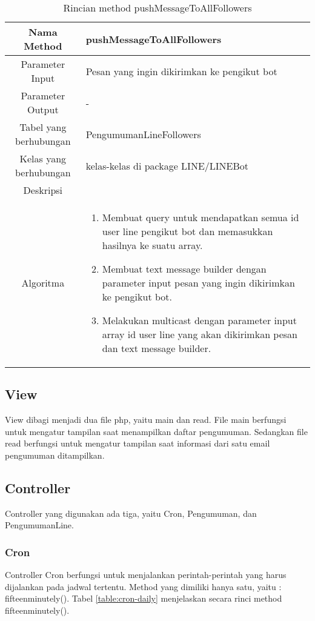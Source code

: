 \begin{center}
	\begin{table}[H]
	\caption{Rincian method pushMessageToAllFollowers}
	\label{table:pengumuman-line-model-pushmessagetoallfollowers}
\begin{tabular}{|c|p{11cm}|}
\hline
Nama Method 	& 	 pushMessageToAllFollowers	\\
\hline
Parameter Input & Pesan yang ingin dikirimkan ke pengikut bot \\
\hline
Parameter Output & - \\
\hline
Tabel yang berhubungan & PengumumanLineFollowers \\
\hline
Kelas yang berhubungan & kelas-kelas di package LINE/LINEBot \\
\hline
Deskripsi	& \\
\hline
Algoritma	& \begin{enumerate}
				\item Membuat query untuk mendapatkan semua id user line pengikut bot dan memasukkan hasilnya ke suatu array.
				\item Membuat text message builder dengan parameter input pesan yang ingin dikirimkan ke pengikut bot.
				\item Melakukan multicast dengan parameter input array id user line yang akan dikirimkan pesan dan text message builder.
				\end{enumerate} \\
\hline
\end{tabular}
\end{table}
\end{center}

\subsection{View}
View dibagi menjadi dua file php, yaitu main dan read. File main berfungsi untuk mengatur tampilan saat menampilkan daftar pengumuman. Sedangkan file read berfungsi untuk mengatur tampilan saat informasi dari satu email pengumuman ditampilkan.

\subsection{Controller}
Controller yang digunakan ada tiga, yaitu Cron, Pengumuman, dan PengumumanLine.
\subsubsection{Cron}
Controller Cron berfungsi untuk menjalankan perintah-perintah yang harus dijalankan pada jadwal tertentu. Method yang dimiliki hanya satu, yaitu : fifteenminutely(). Tabel \ref{table:cron-daily} menjelaskan secara rinci method fifteenminutely().

